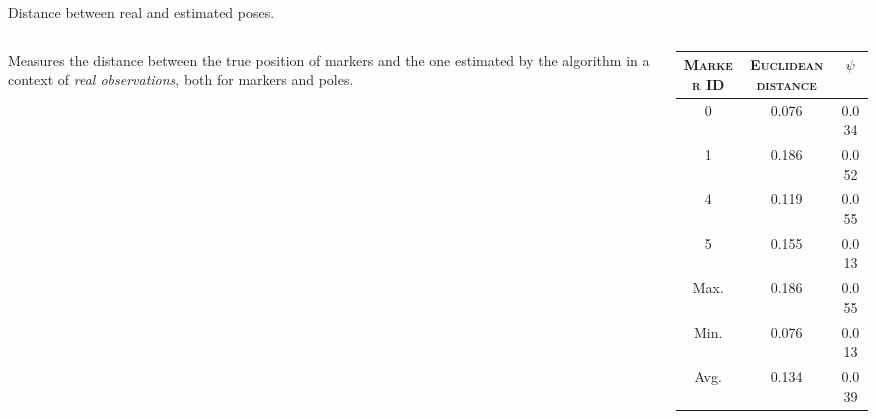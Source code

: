 \documentclass[serif,aspectratio=169]{beamer}
\begin{document}
    \begin{frame}{Distance between real and estimated poses.}
        \begin{columns}[c]
            \begin{column}{.4\textwidth}
                Measures the distance between the true position of markers and the one estimated by the algorithm in a context of \emph{real observations}, both for markers and poles.
            \end{column}
            \begin{column}{.6\textwidth}
               \centering
               \begin{tabular}{ccc}
                   \toprule
                   \textsc{Marker ID} & \textsc{Euclidean distance} &  \textsc{$\psi$} \\
                   \midrule
                   0 & 0.076 & 0.034\\
                   1 & 0.186 & 0.052\\
                   4 & 0.119 & 0.055\\
                   5 & 0.155 & 0.013\\
                   \midrule
                   Max. & 0.186 & 0.055\\
                   Min. & 0.076 & 0.013\\
                   Avg. & 0.134 & 0.039\\
                   \bottomrule
               \end{tabular}
            \end{column}
        \end{columns}

    \end{frame}
\end{document}
